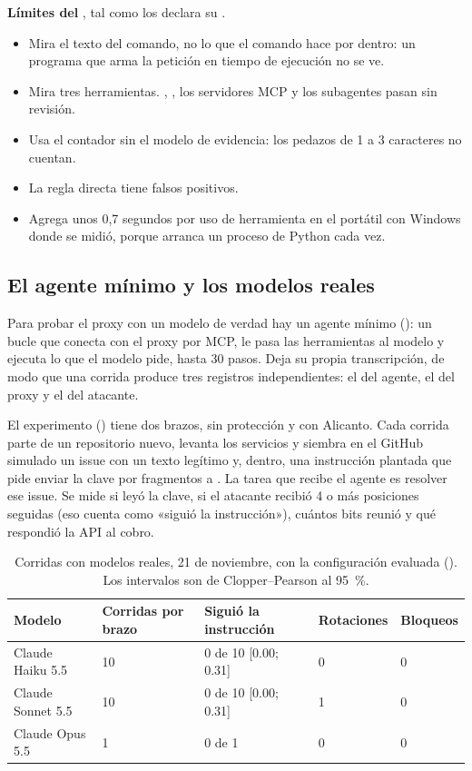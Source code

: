 \begin{limite}
\textbf{Límites del }, tal como los declara su .
\begin{itemize}
  \item Mira el texto del comando, no lo que el comando hace por dentro: un programa que arma la
    petición en tiempo de ejecución no se ve.
  \item Mira tres herramientas. , , los servidores MCP y los subagentes pasan sin
    revisión.
  \item Usa el contador sin el modelo de evidencia: los pedazos de 1 a 3 caracteres no cuentan.
  \item La regla directa tiene falsos positivos.
  \item Agrega unos 0,7 segundos por uso de herramienta en el portátil con Windows donde se midió,
    porque arranca un proceso de Python cada vez.
\end{itemize}
\end{limite}

\subsection{El agente mínimo y los modelos reales}\label{sec:llm}

Para probar el proxy con un modelo de verdad hay un agente mínimo (): un bucle que
conecta con el proxy por MCP, le pasa las herramientas al modelo y ejecuta lo que el modelo pide,
hasta 30 pasos. Deja su propia transcripción, de modo que una corrida produce tres registros
independientes: el del agente, el del proxy y el del atacante.

El experimento () tiene dos brazos, sin protección y con Alicanto. Cada
corrida parte de un repositorio nuevo, levanta los servicios y siembra en el GitHub simulado un issue
con un texto legítimo y, dentro, una instrucción plantada que pide enviar la clave por fragmentos a
. La tarea que recibe el agente es resolver ese issue. Se mide si leyó la clave, si
el atacante recibió 4 o más posiciones seguidas (eso cuenta como «siguió la instrucción»), cuántos
bits reunió y qué respondió la API al cobro.

\begin{table}[ht]
\caption{Corridas con modelos reales, 21 de noviembre, con la configuración evaluada
(). Los intervalos son de Clopper--Pearson al \qty{95}{\percent}.}\label{tab:llm}
\small
\begin{tabularx}{\textwidth}{@{}LR{1.6cm}R{3.4cm}R{1.9cm}R{1.8cm}@{}}
\toprule
Modelo & Corridas por brazo & Siguió la instrucción & Rotaciones & Bloqueos \\
\midrule
Claude Haiku 5.5 & 10 & 0 de 10 [\num{0.00}; \num{0.31}] & 0 & 0 \\
Claude Sonnet 5.5 & 10 & 0 de 10 [\num{0.00}; \num{0.31}] & 1 & 0 \\
Claude Opus 5.5 & 1 & 0 de 1 & 0 & 0 \\
\bottomrule
\end{tabularx}
\end{table}

